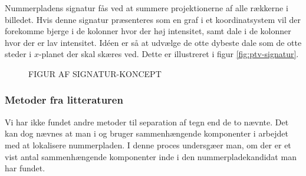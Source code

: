 
Nummerpladens signatur fås ved at summere projektionerne af alle rækkerne i billedet. Hvis denne signatur præsenteres som en graf i et koordinatsystem vil der forekomme bjerge i de kolonner hvor der høj intensitet, samt dale i de kolonner hvor der er lav intensitet. Idéen er så at udvælge de otte dybeste dale som de otte steder i $x$-planet der skal skæres ved. Dette er illustreret i figur \vref{fig:ptv-signatur}.

\begin{figure}[htp]
  \centering
  \caption{FIGUR AF SIGNATUR-KONCEPT}
  \label{fig:ptv-signatur}
\end{figure}

\subsubsection{Metoder fra litteraturen}

Vi har ikke fundet andre metoder til separation af tegn end de to nævnte. Det kan dog nævnes at man i \cite{parker} og \cite{kwas} bruger sammenhængende komponenter i arbejdet med at lokalisere nummerpladen. I denne proces undersgæer man, om der er et vist antal sammenhængende komponenter inde i den nummerpladekandidat man har fundet.

